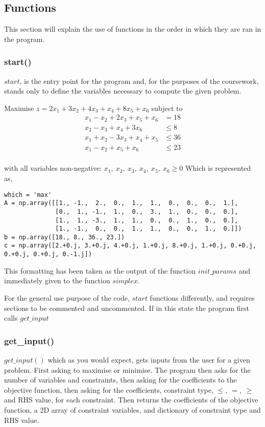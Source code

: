 \documentclass[letterpaper, a4paper]{article}
\begin{document}
\subsection{Functions}
This section will explain the use of functions in the order in which they are ran in the program.
\subsubsection{start()}
$start$, is the entry point for the program and, for the purposes of the coursework, stands only to define the variables necessary to compute the given problem.
\newline

Maximise $z = 2x_1 + 3x_2 + 4x_3 +x_4 + 8x_5 + x_6$ subject to
\begin{align*}
x_1-x_2+2x_3+x_5+x_6 & = 18\\
    x_2-x_3+x_4+3x_6 & \le 8\\
x_1+x_2-3x_3+x_4+x_5 & \le 36\\
     x_1-x_2+x_5+x_6 & \le 23\\
\end{align*}

with all variables non-negative: $x_1,\ x_2,\ x_3,\ x_4,\ x_5,\ x_6\ge 0$
\newline
\newline
Which is represented as,
\begingroup
\fontsize{8}{10}\selectfont
\begin{verbatim}
which = 'max'
A = np.array([[1., -1.,  2.,  0.,  1.,  1.,  0.,  0.,  0.,  1.],
              [0.,  1., -1.,  1.,  0.,  3.,  1.,  0.,  0.,  0.],
              [1.,  1., -3.,  1.,  1.,  0.,  0.,  1.,  0.,  0.],
              [1., -1.,  0.,  0.,  1.,  1.,  0.,  0.,  1.,  0.]])
b = np.array([18., 8., 36., 23.])
c = np.array([2.+0.j, 3.+0.j, 4.+0.j, 1.+0.j, 8.+0.j, 1.+0.j, 0.+0.j, 0.+0.j, 0.+0.j, 0.-1.j])

\end{verbatim}
\endgroup
This formatting has been taken as the output of the function $init\_params$ and immediately given to the function $simplex$.
\newline

For the general use purpose of the code, $start$ functions differently, and requires sections to be commented and uncommented. If in this state the program first calls $get\_input$ 

\subsubsection{get\_input()}
$get\_input()$ which as you would expect, gets inputs from the user for a given problem. First asking to maximise or minimise. The program then asks for the number of variables and constraints, then asking for the coefficients to the objective function, then asking for the coefficients, constraint type, $\le,\ =,\ \ge$ and RHS value, for each constraint. Then returns the coefficients of the objective function, a 2D array of constraint variables, and dictionary of constraint type and RHS value.
\newline
\end{document}
